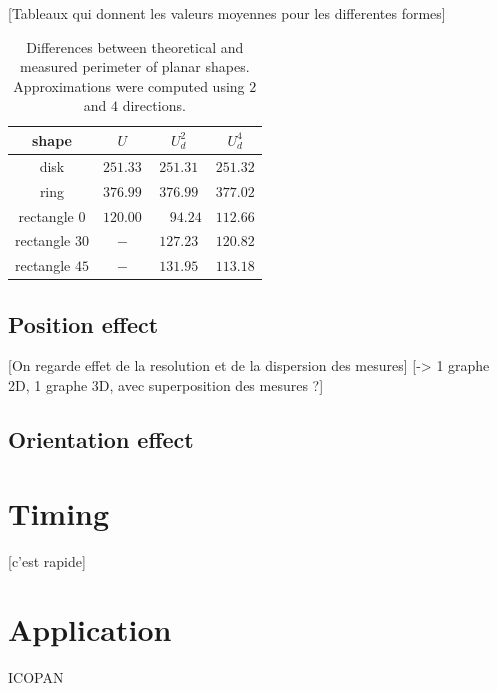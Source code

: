 \documentclass{InsightArticle}
\begin{document}
[Tableaux qui donnent les valeurs moyennes pour les differentes formes]

%
\begin{table}[!htb]
\begin{center}
\begin{tabular}{|c|c|c|c|} \hline 
shape		    & $U$		& $U_d^2$ & $U_d^4$		\tabularnewline \hline
disk		    & $251.33$	& $251.31$ 	& $251.32$ 	\tabularnewline
ring		    & $376.99$	& $376.99$ 	& $377.02$	\tabularnewline
rectangle  $0$ 	& $120.00$ 	&\ \ $94.24$& $112.66$	\tabularnewline
rectangle $30$  & $-$ 		& $127.23$	& $120.82$	\tabularnewline
rectangle $45$  & $-$ 		& $131.95$	& $113.18$	\tabularnewline
\hline
\end{tabular}\end{center}
\caption{\label{tab:Validate-Perimeter}
Differences between theoretical and measured perimeter of planar shapes.
Approximations were computed using $2$ and $4$ directions.
}
\end{table}

\subsection{Position effect}

[On regarde effet de la resolution et de la dispersion des mesures]
[-> 1 graphe 2D, 1 graphe 3D, avec superposition des mesures ?]

\subsection{Orientation effect}


\section{Timing}

[c'est rapide]

\section{Application}

ICOPAN


\appendix





\nocite{ITKSoftwareGuide}
\end{document}
